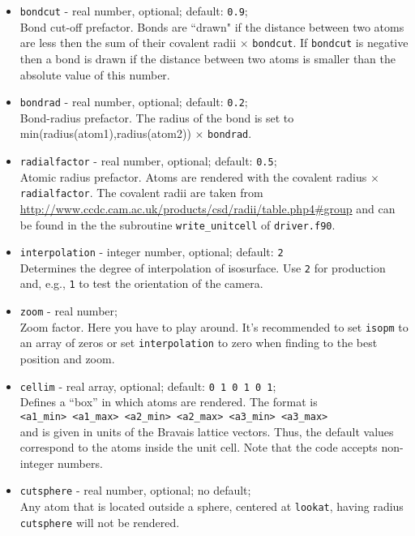 \documentclass[
  notitlepage,
  twoside,
   prb,
  floatfix,
]{revtex4-1}
\begin{document}
\begin{itemize}
\item
{\tt bondcut} - real number, optional; default: {\tt 0.9}; \\
Bond cut-off prefactor. Bonds are ``drawn" if the distance between two atoms are less then the sum of their covalent radii $\times$ {\tt bondcut}. If {\tt bondcut} is negative then a bond is drawn if the distance between two atoms is smaller than the absolute value of this number.

\item
{\tt bondrad} - real number, optional; default: {\tt 0.2}; \\
Bond-radius prefactor. The radius of the bond is set to min(radius(atom1),radius(atom2)) $\times$ {\tt bondrad}.

\item
{\tt radialfactor} - real number, optional; default: {\tt 0.5}; \\
Atomic radius prefactor. Atoms are rendered with the covalent radius $\times$ {\tt radialfactor}. The covalent radii are taken from \url{http://www.ccdc.cam.ac.uk/products/csd/radii/table.php4#group} and can be found in the the subroutine {\tt write\_unitcell} of {\tt driver.f90}.

\item
{\tt interpolation} - integer number, optional; default: {\tt 2}\\
Determines the degree of interpolation of isosurface. Use {\tt 2} for production and, e.g., {\tt 1} to test the orientation of the camera.

\item
{\tt zoom} - real number;\\
Zoom factor. Here you have to play around. It's recommended to set {\tt isopm} to an array of zeros or set {\tt interpolation} to zero when finding to the best position and zoom.

\item
{\tt cellim} - real array, optional; default: {\tt 0\ 1\ 0\ 1\ 0\ 1}; \\
Defines a ``box'' in which atoms are rendered. The format is \\
{\tt <a1\_min> <a1\_max> <a2\_min> <a2\_max> <a3\_min> <a3\_max>} \\
and is given in units of the Bravais lattice vectors. Thus, the default values correspond to the atoms inside the unit cell. Note that the code accepts non-integer numbers.

\item
{\tt cutsphere} - real number, optional; no default; \\
Any atom that is located outside a sphere, centered at {\tt lookat}, having radius {\tt cutsphere} will not be rendered.


\end{itemize}
\end{document}
